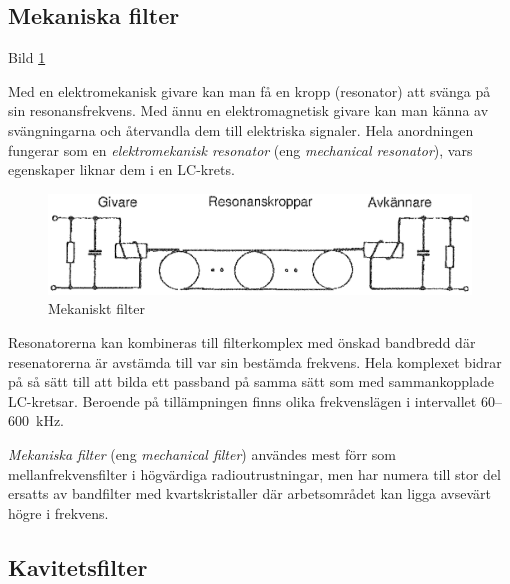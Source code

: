 \subsection{Mekaniska filter}

Bild \ref{fig:BildII3-30}

Med en elektromekanisk givare kan man få en kropp (resonator) att svänga på sin
resonansfrekvens. Med ännu en elektromagnetisk givare kan man känna av
svängningarna och återvandla dem till elektriska signaler. Hela anordningen
fungerar som en \emph{elektromekanisk resonator} (eng
\emph{mechanical resonator}), vars egenskaper liknar dem i en LC-krets.

\begin{figure}
\includegraphics[width=\textwidth]{images/cropped_pdfs/bild_2_3-30.pdf}
\caption{Mekaniskt filter}
\label{fig:BildII3-30}
\end{figure}

Resonatorerna kan kombineras till filterkomplex med önskad bandbredd där
resenatorerna är avstämda till var sin bestämda frekvens. Hela komplexet bidrar
på så sätt till att bilda ett passband på samma sätt som med sammankopplade
LC-kretsar. Beroende på tillämpningen finns olika frekvenslägen i intervallet
60--600~kHz.

\emph{Mekaniska filter} (eng \emph{mechanical filter}) användes mest förr som
mellanfrekvensfilter i högvärdiga radioutrustningar, men har numera till stor
del ersatts av bandfilter med kvartskristaller där arbetsområdet kan ligga
avsevärt högre i frekvens.

\subsection{Kavitetsfilter}

